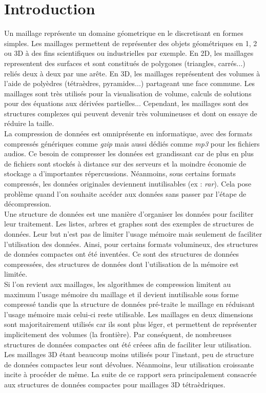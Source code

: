 \documentclass[a4paper,11pt,openany]{article}
\begin{document}
\section{Introduction}
\noindent
Un maillage représente un domaine géometrique en le discretisant en formes simples. Les maillages permettent de représenter des objets géométriques en 1, 2 ou 3D à des fins scientifiques ou industrielles par exemple. En 2D, les maillages representent des surfaces et sont constitués de polygones (triangles, carrés...) reliés deux à deux par une arête. En 3D, les maillages représentent des volumes à l'aide de polyèdres (tétraèdres, pyramides...) partageant une face commune. Les maillages sont très utilisés pour la visualisation de volume, calculs de solutions pour des équations aux dérivées partielles... Cependant, les maillages sont des structures complexes qui peuvent devenir très volumineuses et dont on essaye de réduire la taille.\\
La compression de données est omniprésente en informatique, avec des formats compressés génériques comme \textit{gzip} mais aussi dédiés comme \textit{mp3} pour les fichiers audios. Ce besoin de compresser les données est grandissant car de plus en plus de fichiers sont stockés à distance sur des serveurs et la moindre économie de stockage a d'importantes répercussions. Néanmoins, sous certains formats compressés, les données originales deviennent inutilisables (ex : \textit{rar}). Cela pose problème quand l'on souhaite accéder aux données  sans passer par l'étape de décompression.\\
Une structure de données est une manière d'organiser les données pour faciliter leur traitement. Les listes, arbres et graphes sont des exemples de structures de données. Leur but n'est pas de limiter l'usage mémoire mais seulement de faciliter l'utilisation des données. Ainsi, pour certains formats volumineux, des structures de données compactes ont été inventées. Ce sont des structures de données compressées, des structures de données dont l'utilisation de la mémoire est limitée.\\
Si l'on revient aux maillages, les algorithmes de compression limitent au maximum l'usage mémoire du maillage et il devient inutilisable sous forme compressé tandis que la structure de données pré-traite le maillage en réduisant l'usage mémoire mais celui-ci reste utilisable. Les maillages en deux dimensions sont majoritairement utilisés car ils sont plus léger, et permettent de représenter implicitement des volumes (la frontière). Par conséquent, de nombreuses structures de données compactes ont été créees afin de faciliter leur utilisation. Les maillages 3D étant beaucoup moins utilisés pour l'instant, peu de structure de données compactes leur sont dévolues. Néanmoins, leur utilisation croissante incite à procéder de même. La suite de ce rapport sera principalement consacrée aux structures de données compactes pour maillages 3D tétraèdriques.\\\\
\end{document}
